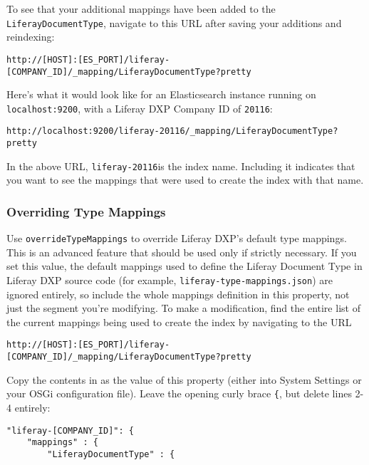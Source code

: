 To see that your additional mappings have been added to the
\texttt{LiferayDocumentType}, navigate to this URL after saving your
additions and reindexing:

\begin{verbatim}
http://[HOST]:[ES_PORT]/liferay-[COMPANY_ID]/_mapping/LiferayDocumentType?pretty
\end{verbatim}

Here's what it would look like for an Elasticsearch instance running on
\texttt{localhost:9200}, with a Liferay DXP Company ID of
\texttt{20116}:

\begin{verbatim}
http://localhost:9200/liferay-20116/_mapping/LiferayDocumentType?pretty
\end{verbatim}

In the above URL, \texttt{liferay-20116}is the index name. Including it
indicates that you want to see the mappings that were used to create the
index with that name.

\subsubsection{Overriding Type Mappings}\label{overriding-type-mappings}

Use \texttt{overrideTypeMappings} to override Liferay DXP's default type
mappings. This is an advanced feature that should be used only if
strictly necessary. If you set this value, the default mappings used to
define the Liferay Document Type in Liferay DXP source code (for
example, \texttt{liferay-type-mappings.json}) are ignored entirely, so
include the whole mappings definition in this property, not just the
segment you're modifying. To make a modification, find the entire list
of the current mappings being used to create the index by navigating to
the URL

\begin{verbatim}
http://[HOST]:[ES_PORT]/liferay-[COMPANY_ID]/_mapping/LiferayDocumentType?pretty
\end{verbatim}

Copy the contents in as the value of this property (either into System
Settings or your OSGi configuration file). Leave the opening curly brace
\texttt{\{}, but delete lines 2-4 entirely:

\begin{verbatim}
"liferay-[COMPANY_ID]": {
    "mappings" : {
        "LiferayDocumentType" : {
\end{verbatim}

